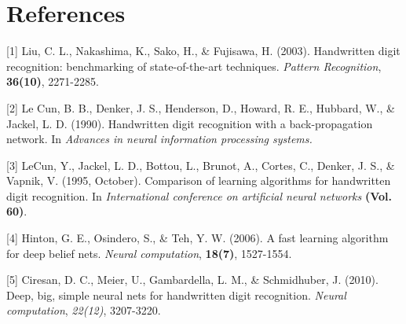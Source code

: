 \documentclass{article} %
\begin{document}
\section{References}

\small{
[1] Liu, C. L., Nakashima, K., Sako, H., \& Fujisawa, H. (2003). Handwritten
digit recognition: benchmarking of state-of-the-art techniques. {\it Pattern
    Recognition}, {\bf 36(10)}, 2271-2285.

[2] Le Cun, B. B., Denker, J. S., Henderson, D., Howard, R. E., Hubbard, W., \&
Jackel, L. D. (1990). Handwritten digit recognition with a back-propagation
network. In {\it Advances in neural information processing systems.}

[3] LeCun, Y., Jackel, L. D., Bottou, L., Brunot, A., Cortes, C., Denker, J.
S., \& Vapnik, V. (1995, October). Comparison of learning algorithms for
handwritten digit recognition. In {\it International conference on artificial
    neural networks} {\bf (Vol. 60)}.

[4] Hinton, G. E., Osindero, S., \& Teh, Y. W. (2006). A fast learning
algorithm for deep belief nets. {\it Neural computation}, {\bf 18(7)}, 1527-1554.

[5] Ciresan, D. C., Meier, U., Gambardella, L. M., \& Schmidhuber, J. (2010).
Deep, big, simple neural nets for handwritten digit recognition. {\it Neural
    computation}, {\it 22(12)}, 3207-3220.
}
\end{document}
